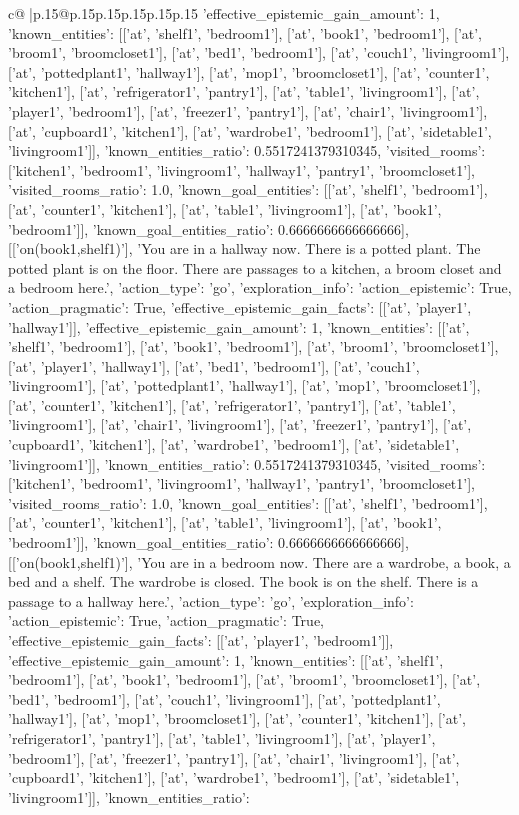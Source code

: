 \documentclass{article}
\begin{document}
{\begin{supertabular}{c@{$\;$}|p{.15\linewidth}@{}p{.15\linewidth}p{.15\linewidth}p{.15\linewidth}p{.15\linewidth}p{.15\linewidth}}
{{{'effective_epistemic_gain_amount': 1, 'known_entities': [['at', 'shelf1', 'bedroom1'], ['at', 'book1', 'bedroom1'], ['at', 'broom1', 'broomcloset1'], ['at', 'bed1', 'bedroom1'], ['at', 'couch1', 'livingroom1'], ['at', 'pottedplant1', 'hallway1'], ['at', 'mop1', 'broomcloset1'], ['at', 'counter1', 'kitchen1'], ['at', 'refrigerator1', 'pantry1'], ['at', 'table1', 'livingroom1'], ['at', 'player1', 'bedroom1'], ['at', 'freezer1', 'pantry1'], ['at', 'chair1', 'livingroom1'], ['at', 'cupboard1', 'kitchen1'], ['at', 'wardrobe1', 'bedroom1'], ['at', 'sidetable1', 'livingroom1']], 'known_entities_ratio': 0.5517241379310345, 'visited_rooms': ['kitchen1', 'bedroom1', 'livingroom1', 'hallway1', 'pantry1', 'broomcloset1'], 'visited_rooms_ratio': 1.0, 'known_goal_entities': [['at', 'shelf1', 'bedroom1'], ['at', 'counter1', 'kitchen1'], ['at', 'table1', 'livingroom1'], ['at', 'book1', 'bedroom1']], 'known_goal_entities_ratio': 0.6666666666666666}}], [['on(book1,shelf1)'], 'You are in a hallway now. There is a potted plant. The potted plant is on the floor. There are passages to a kitchen, a broom closet and a bedroom here.', {'action_type': 'go', 'exploration_info': {'action_epistemic': True, 'action_pragmatic': True, 'effective_epistemic_gain_facts': [['at', 'player1', 'hallway1']], 'effective_epistemic_gain_amount': 1, 'known_entities': [['at', 'shelf1', 'bedroom1'], ['at', 'book1', 'bedroom1'], ['at', 'broom1', 'broomcloset1'], ['at', 'player1', 'hallway1'], ['at', 'bed1', 'bedroom1'], ['at', 'couch1', 'livingroom1'], ['at', 'pottedplant1', 'hallway1'], ['at', 'mop1', 'broomcloset1'], ['at', 'counter1', 'kitchen1'], ['at', 'refrigerator1', 'pantry1'], ['at', 'table1', 'livingroom1'], ['at', 'chair1', 'livingroom1'], ['at', 'freezer1', 'pantry1'], ['at', 'cupboard1', 'kitchen1'], ['at', 'wardrobe1', 'bedroom1'], ['at', 'sidetable1', 'livingroom1']], 'known_entities_ratio': 0.5517241379310345, 'visited_rooms': ['kitchen1', 'bedroom1', 'livingroom1', 'hallway1', 'pantry1', 'broomcloset1'], 'visited_rooms_ratio': 1.0, 'known_goal_entities': [['at', 'shelf1', 'bedroom1'], ['at', 'counter1', 'kitchen1'], ['at', 'table1', 'livingroom1'], ['at', 'book1', 'bedroom1']], 'known_goal_entities_ratio': 0.6666666666666666}}], [['on(book1,shelf1)'], 'You are in a bedroom now. There are a wardrobe, a book, a bed and a shelf. The wardrobe is closed. The book is on the shelf. There is a passage to a hallway here.', {'action_type': 'go', 'exploration_info': {'action_epistemic': True, 'action_pragmatic': True, 'effective_epistemic_gain_facts': [['at', 'player1', 'bedroom1']], 'effective_epistemic_gain_amount': 1, 'known_entities': [['at', 'shelf1', 'bedroom1'], ['at', 'book1', 'bedroom1'], ['at', 'broom1', 'broomcloset1'], ['at', 'bed1', 'bedroom1'], ['at', 'couch1', 'livingroom1'], ['at', 'pottedplant1', 'hallway1'], ['at', 'mop1', 'broomcloset1'], ['at', 'counter1', 'kitchen1'], ['at', 'refrigerator1', 'pantry1'], ['at', 'table1', 'livingroom1'], ['at', 'player1', 'bedroom1'], ['at', 'freezer1', 'pantry1'], ['at', 'chair1', 'livingroom1'], ['at', 'cupboard1', 'kitchen1'], ['at', 'wardrobe1', 'bedroom1'], ['at', 'sidetable1', 'livingroom1']], 'known_entities_ratio': }}}
\end{supertabular}}
\end{document}

